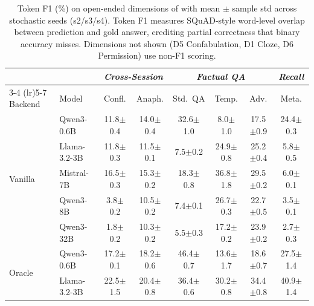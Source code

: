\begin{table}[t]
\centering
\caption{Token F1 (\%) on open-ended dimensions of \benchL{} with mean $\pm$ sample std across stochastic seeds (s2/s3/s4). Token F1 measures SQuAD-style word-level overlap between prediction and gold answer, crediting partial correctness that binary accuracy misses. Dimensions not shown (D5 Confabulation, D1 Cloze, D6 Permission) use non-F1 scoring.}
\label{tab:results-L-f1}
\scriptsize
\setlength{\tabcolsep}{3pt}
\begin{tabular}{@{}ll cccccc@{}}
\toprule
& & \multicolumn{2}{c}{\textit{Cross-Session}} & \multicolumn{3}{c}{\textit{Factual QA}} & \textit{Recall} \\
\cmidrule(lr){3-4} \cmidrule(lr){5-7}
Backend & Model & Confl. & Anaph. & Std.\ QA & Temp. & Adv. & Meta. \\
\midrule
\multirow{5}{*}{Vanilla}
  & Qwen3-0.6B     & 11.8{\scriptsize$\pm$0.4} & 14.0{\scriptsize$\pm$0.4} & 32.6{\scriptsize$\pm$1.0} & 8.0{\scriptsize$\pm$1.0} & 17.5{\scriptsize$\pm$0.9} & 24.4{\scriptsize$\pm$0.3} \\

  & Llama-3.2-3B   & 11.8{\scriptsize$\pm$0.3} & 11.5{\scriptsize$\pm$0.1} & 7.5{\scriptsize$\pm$0.2} & 24.9{\scriptsize$\pm$0.8} & 25.2{\scriptsize$\pm$0.4} & 5.8{\scriptsize$\pm$0.5} \\

  & Mistral-7B     & 16.5{\scriptsize$\pm$0.3} & 15.3{\scriptsize$\pm$0.2} & 18.3{\scriptsize$\pm$0.8} & 36.8{\scriptsize$\pm$1.8} & 29.5{\scriptsize$\pm$0.2} & 6.0{\scriptsize$\pm$0.1} \\

  & Qwen3-8B       & 3.8{\scriptsize$\pm$0.2} & 10.5{\scriptsize$\pm$0.2} & 7.4{\scriptsize$\pm$0.1} & 26.7{\scriptsize$\pm$0.3} & 22.7{\scriptsize$\pm$0.5} & 3.5{\scriptsize$\pm$0.1} \\

  & Qwen3-32B      & 1.8{\scriptsize$\pm$0.2} & 10.3{\scriptsize$\pm$0.2} & 5.5{\scriptsize$\pm$0.3} & 17.2{\scriptsize$\pm$0.2} & 23.9{\scriptsize$\pm$0.2} & 2.7{\scriptsize$\pm$0.3} \\
\midrule
\multirow{5}{*}{Oracle}
  & Qwen3-0.6B     & 17.2{\scriptsize$\pm$0.1} & 18.2{\scriptsize$\pm$0.6} & 46.4{\scriptsize$\pm$0.7} & 13.6{\scriptsize$\pm$1.7} & 18.6{\scriptsize$\pm$0.7} & 27.5{\scriptsize$\pm$1.4} \\

  & Llama-3.2-3B   & 22.5{\scriptsize$\pm$1.5} & 20.4{\scriptsize$\pm$0.8} & 36.4{\scriptsize$\pm$0.6} & 30.2{\scriptsize$\pm$0.8} & 34.4{\scriptsize$\pm$0.8} & 40.9{\scriptsize$\pm$1.4} \\


\end{tabular}
\end{table}
